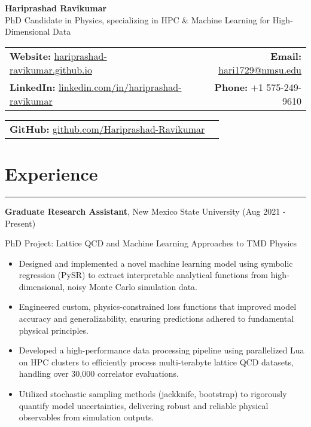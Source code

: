 \documentclass[11pt]{article}
\begin{document}
\begin{center}
  \textbf{\Huge Hariprashad Ravikumar} \\[0.6em]
  \vspace{0.5em}
  PhD Candidate in Physics, specializing in HPC \& Machine Learning for High‐Dimensional Data \\
\end{center}

\begin{tabularx}{\textwidth}{@{}Xr@{}}
    \textbf{Website:} \href{https://hariprashad-ravikumar.github.io}{hariprashad-ravikumar.github.io} & \textbf{Email:} \href{mailto:hari1729@nmsu.edu}{hari1729@nmsu.edu}  \\
    \textbf{LinkedIn:} \href{https://www.linkedin.com/in/hariprashad-ravikumar}{linkedin.com/in/hariprashad-ravikumar} & \textbf{Phone:} +1 575-249-9610 
\end{tabularx}
\vspace{-1em}
\begin{tabularx}{\textwidth}{@{}Xr@{}}
\textbf{GitHub:} \href{https://github.com/Hariprashad-Ravikumar}{github.com/Hariprashad-Ravikumar}  \\
\end{tabularx}


\section*{Experience}
\hrule
\vspace{-0.3em}
\textbf{Graduate Research Assistant}, New Mexico State University \hfill (Aug 2021 - Present)
\vspace{-0.2em}

PhD Project: Lattice QCD and Machine Learning Approaches to TMD Physics
\vspace{-0.5em}
\begin{itemize}
    \item Designed and implemented a novel machine learning model using symbolic regression (PySR) to extract interpretable analytical functions from high-dimensional, noisy Monte Carlo simulation data.
    \vspace{-1.5em}
    \item Engineered custom, physics-constrained loss functions that improved model accuracy and generalizability, ensuring predictions adhered to fundamental physical principles.
    \vspace{-0.5em}
    \item Developed a high-performance data processing pipeline using parallelized Lua on HPC clusters to efficiently process multi-terabyte lattice QCD datasets, handling over 30,000 correlator evaluations.
    \vspace{-0.5em}
    \item Utilized stochastic sampling methods (jackknife, bootstrap) to rigorously quantify model uncertainties, delivering robust and reliable physical observables from simulation outputs.
\end{itemize}
\end{document}
